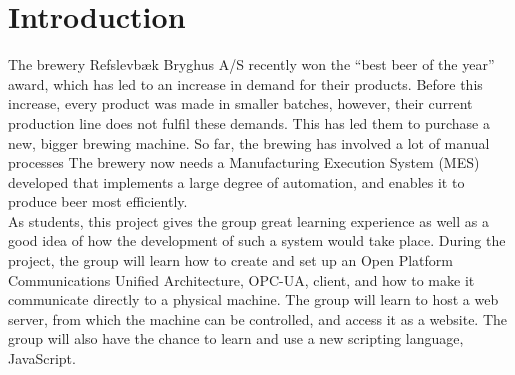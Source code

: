 \section{Introduction}
The brewery Refslevbæk Bryghus A/S recently won the “best beer of the year” 
award, which has led to an increase in demand for their products. Before this
increase, every product was made in smaller batches, however, their current
production line does not fulfil these demands. This has led them to purchase a
new, bigger brewing machine. So far, the brewing has involved a lot of manual
processes The brewery now needs a Manufacturing Execution System (MES) developed
that implements a large degree of automation, and enables it to produce beer
most efficiently.\\

As students, this project gives the group great learning experience as
well as a good idea of how the development of such a system would take place. 
During the project, the group will learn how to create and set up an Open
Platform Communications Unified Architecture, OPC-UA, client, and how to make it
communicate directly to a physical machine. The group will learn to host a web
server, from which the machine can be controlled, and access it as a website.
The group will also have the chance to learn and use a new scripting language,
JavaScript.

